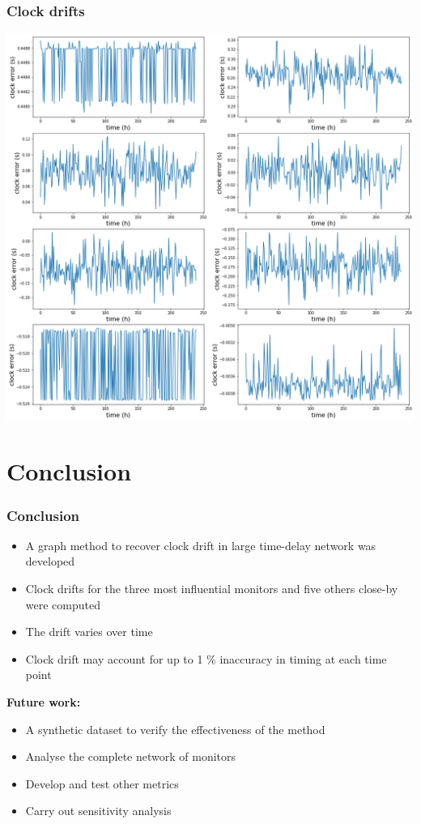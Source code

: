 \documentclass{beamer}
\begin{document}
 \begin{frame}
\frametitle{Clock drifts}
\includegraphics[height=0.9\textheight]{../figures/results-for-eight-network.png}
\end{frame}

\section{Conclusion}
 \begin{frame}
\frametitle{Conclusion}
\begin{itemize}
\item A graph method to recover clock drift in large time-delay network was developed
\item Clock drifts for the three most influential monitors and five others close-by were computed
\item The drift varies over time
\item Clock drift may account for up to 1 \% inaccuracy in timing at each time point
\end{itemize}
\vspace{0.5cm}
\textbf{\large{Future work:}}\normalsize 
\begin{itemize}
\item A synthetic dataset to verify the effectiveness of the method
\item Analyse the complete network of monitors
\item Develop and test other metrics
\item Carry out sensitivity analysis
\end{itemize}
\end{frame}
\end{document}
